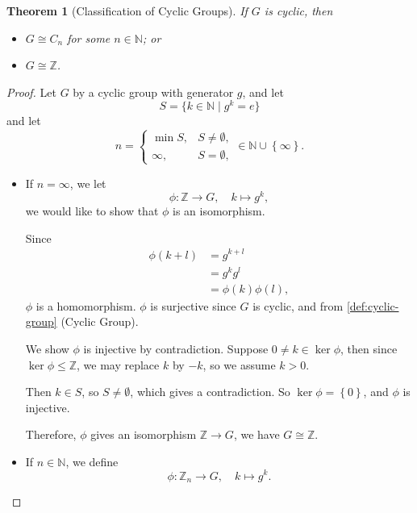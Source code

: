 \documentclass{article}
\newtheorem{theorem}{Theorem}[section]
\theoremstyle{definition}
\theoremstyle{remark}
\newcommand{\pqty}[1]{\left(#1\right)}
\newcommand{\Bqty}[1]{\left\{#1\right\}}
\newcommand{\set}[2]{\{#1\mid #2\}}
\newcommand{\function}[5]{#1:#2\to #3,\quad #4\mapsto #5}
\newcommand{\isomorphic}{\cong}
\newcommand{\subgroup}{\leq}
\newcommand{\ZZ}{\mathbb{Z}}
\newcommand{\NN}{\mathbb{N}}
\begin{document}
\begin{theorem}[Classification of Cyclic Groups]
    \label{thm:classification-cyclic-groups}%
    If \(G\) is cyclic, then
    \begin{itemize}
        \item \(G \isomorphic C_n\) for some \(n \in \NN\); or
        \item \(G \isomorphic \ZZ\).
    \end{itemize}
\end{theorem}

\begin{proof}
    Let \(G\) by a cyclic group with generator \(g\), and let
    \[
        S = \set{k \in \NN}{g^k = e}
    \]
    and let
    \[
        n = \begin{cases}
            \min S, & S \neq \emptyset, \\
            \infty, & S = \emptyset,
        \end{cases}
        \in \NN \cup \Bqty{\infty}.
    \]

    \begin{itemize}
        \item If \(n = \infty\), we let
        \[
            \function{\phi}{\ZZ}{G}{k}{g^k,}
        \]
        we would like to show that \(\phi\) is an isomorphism.

        Since
        \begin{align*}
            \phi \pqty{k + l} &= g^{k + l} \\
            &= g^k g^l \\
            &= \phi \pqty{k} \phi \pqty{l},
        \end{align*}
        \(\phi\) is a homomorphism. \(\phi\) is surjective since \(G\) is cyclic, and from \autoref{def:cyclic-group} (Cyclic Group).

        We show \(\phi\) is injective by contradiction. Suppose \(0 \neq k \in \ker \phi\), then since \(\ker \phi \subgroup \ZZ\), we may replace \(k\) by \(-k\), so we assume \(k > 0\).

        Then \(k \in S\), so \(S \neq \emptyset\), which gives a contradiction. So \(\ker \phi = \Bqty{0}\), and \(\phi\) is injective.

        Therefore, \(\phi\) gives an isomorphism \(\ZZ \to G\), we have \(G \isomorphic \ZZ\).

        \item If \(n \in \NN\), we define
        \[
            \function{\phi}{\ZZ_n}{G}{k}{g^k.}
        \]


\end{itemize}
\end{proof}
\end{document}
